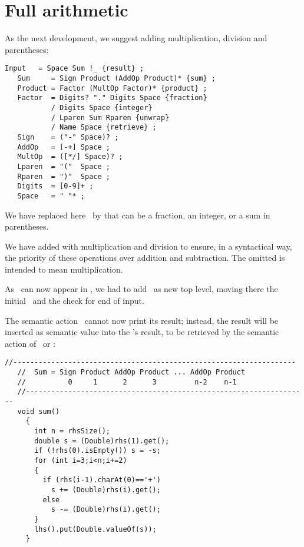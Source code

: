
\section{Full arithmetic\label{arith}}


As the next development, we suggest adding multiplication, division
and parentheses:

\small
\begin{Verbatim}[frame=single,framesep=2mm,samepage=true,xleftmargin=15mm,xrightmargin=15mm,baselinestretch=0.8]
   Input   = Space Sum !_ {result} ;
   Sum     = Sign Product (AddOp Product)* {sum} ;
   Product = Factor (MultOp Factor)* {product} ;
   Factor  = Digits? "." Digits Space {fraction}
           / Digits Space {integer}
           / Lparen Sum Rparen {unwrap} 
           / Name Space {retrieve} ; 
   Sign    = ("-" Space)? ;
   AddOp   = [-+] Space ;
   MultOp  = ([*/] Space)? ;
   Lparen  = "("  Space ;
   Rparen  = ")"  Space ;
   Digits  = [0-9]+ ;
   Space   = " "* ;
\end{Verbatim}
\normalsize

We have replaced here \Number\ by  that can be 
a fraction, an integer, or a sum in parentheses.

We have added  with multiplication and division
to ensure, in a syntactical way, the priority of these operations
over addition and subtraction.
The omitted  is intended to mean multiplication.

As \Sum\ can now appear in ,
we had to add \Input\ as new top level, 
moving there the initial \Space\ and the check for end of input.

The semantic action \Suma\ cannot now print its result;
instead, the result will be inserted as semantic value 
into the \Sum's result,
to be retrieved by the semantic action of \Input\ or \Factor:

\small
\begin{Verbatim}[frame=single,framesep=2mm,samepage=true,xleftmargin=15mm,xrightmargin=15mm,baselinestretch=0.8]
   //-------------------------------------------------------------------
   //  Sum = Sign Product AddOp Product ... AddOp Product
   //          0     1      2      3         n-2    n-1
   //-------------------------------------------------------------------
   void sum()
     {
       int n = rhsSize();
       double s = (Double)rhs(1).get();
       if (!rhs(0).isEmpty()) s = -s;
       for (int i=3;i<n;i+=2)
       {
         if (rhs(i-1).charAt(0)=='+')
           s += (Double)rhs(i).get();
         else
           s -= (Double)rhs(i).get();
       }
       lhs().put(Double.valueOf(s));
     }
\end{Verbatim}
\normalsize

